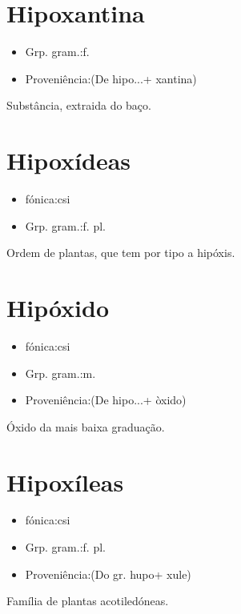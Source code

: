 \documentclass{article}
\begin{document}
\section{Hipoxantina}
\begin{itemize}
\item {Grp. gram.:f.}
\end{itemize}
\begin{itemize}
\item {Proveniência:(De \textunderscore hipo...\textunderscore  + \textunderscore xantina\textunderscore )}
\end{itemize}
Substância, extraida do baço.
\section{Hipoxídeas}
\begin{itemize}
\item {fónica:csi}
\end{itemize}
\begin{itemize}
\item {Grp. gram.:f. pl.}
\end{itemize}
Ordem de plantas, que tem por tipo a hipóxis.
\section{Hipóxido}
\begin{itemize}
\item {fónica:csi}
\end{itemize}
\begin{itemize}
\item {Grp. gram.:m.}
\end{itemize}
\begin{itemize}
\item {Proveniência:(De \textunderscore hipo...\textunderscore  + \textunderscore òxido\textunderscore )}
\end{itemize}
Óxido da mais baixa graduação.
\section{Hipoxíleas}
\begin{itemize}
\item {fónica:csi}
\end{itemize}
\begin{itemize}
\item {Grp. gram.:f. pl.}
\end{itemize}
\begin{itemize}
\item {Proveniência:(Do gr. \textunderscore hupo\textunderscore  + \textunderscore xule\textunderscore )}
\end{itemize}
Família de plantas acotiledóneas.
\end{document}
